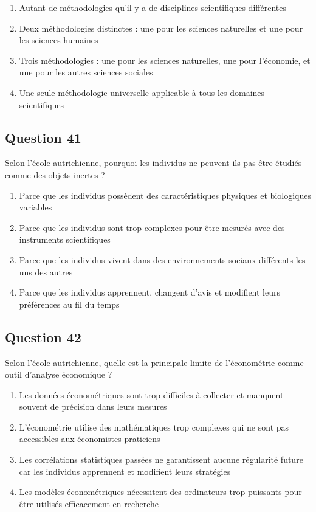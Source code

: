 \documentclass[12pt,a4paper]{article}
\begin{document}
\begin{enumerate}[label=\Alph*., leftmargin=*]
\item Autant de méthodologies qu'il y a de disciplines scientifiques différentes
\item Deux méthodologies distinctes : une pour les sciences naturelles et une pour les sciences humaines
\item Trois méthodologies : une pour les sciences naturelles, une pour l'économie, et une pour les autres sciences sociales
\item Une seule méthodologie universelle applicable à tous les domaines scientifiques
\end{enumerate}

\bigskip


\subsection*{Question 41}
Selon l'école autrichienne, pourquoi les individus ne peuvent-ils pas être étudiés comme des objets inertes ?

\begin{enumerate}[label=\Alph*., leftmargin=*]
\item Parce que les individus possèdent des caractéristiques physiques et biologiques variables
\item Parce que les individus sont trop complexes pour être mesurés avec des instruments scientifiques
\item Parce que les individus vivent dans des environnements sociaux différents les uns des autres
\item Parce que les individus apprennent, changent d'avis et modifient leurs préférences au fil du temps
\end{enumerate}

\bigskip


\subsection*{Question 42}
Selon l'école autrichienne, quelle est la principale limite de l'économétrie comme outil d'analyse économique ?

\begin{enumerate}[label=\Alph*., leftmargin=*]
\item Les données économétriques sont trop difficiles à collecter et manquent souvent de précision dans leurs mesures
\item L'économétrie utilise des mathématiques trop complexes qui ne sont pas accessibles aux économistes praticiens
\item Les corrélations statistiques passées ne garantissent aucune régularité future car les individus apprennent et modifient leurs stratégies
\item Les modèles économétriques nécessitent des ordinateurs trop puissants pour être utilisés efficacement en recherche
\end{enumerate}
\end{document}
